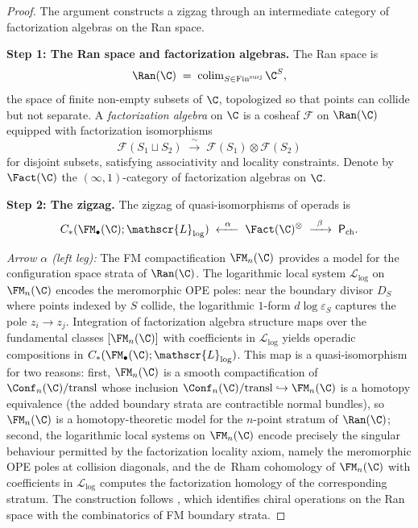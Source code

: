 \begin{proof}
The argument constructs a zigzag through an intermediate category of factorization algebras on the Ran space.

\medskip\noindent
\textbf{Step 1: The Ran space and factorization algebras.}
The Ran space is
\[
\Ran(\C) \;=\; \operatorname{colim}_{S \in \mathrm{Fin}^{\mathrm{surj}}} \C^S,
\]
the space of finite non-empty subsets of $\C$, topologized so that points can collide but not separate. A \emph{factorization algebra} on $\C$ is a cosheaf $\mathcal{F}$ on $\Ran(\C)$ equipped with factorization isomorphisms
\[
\mathcal{F}(S_1 \sqcup S_2) \;\xrightarrow{\;\sim\;}\; \mathcal{F}(S_1) \otimes \mathcal{F}(S_2)
\]
for disjoint subsets, satisfying associativity and locality constraints. Denote by $\Fact(\C)$ the $(\infty,1)$-category of factorization algebras on $\C$.

\medskip\noindent
\textbf{Step 2: The zigzag.}
The zigzag of quasi-isomorphisms of operads is
\[
C_\ast(\FM_\bullet(\C);\mathscr{L}_{\log}) \;\xleftarrow{\;\;\alpha\;\;}\; \Fact(\C)^{\otimes} \;\xrightarrow{\;\;\beta\;\;}\; \mathsf{P}_{\mathrm{ch}}.
\]

\emph{Arrow $\alpha$ (left leg):} The FM compactification $\FM_n(\C)$ provides a model for the configuration space strata of $\Ran(\C)$. The logarithmic local system $\mathscr{L}_{\log}$ on $\FM_n(\C)$ encodes the meromorphic OPE poles: near the boundary divisor $D_S$ where points indexed by $S$ collide, the logarithmic $1$-form $d\log\varepsilon_S$ captures the pole $z_i \to z_j$. Integration of factorization algebra structure maps over the fundamental classes $[\FM_n(\C)]$ with coefficients in $\mathscr{L}_{\log}$ yields operadic compositions in $C_\ast(\FM_\bullet(\C);\mathscr{L}_{\log})$. This map is a quasi-isomorphism for two reasons: first, $\FM_n(\C)$ is a smooth compactification of $\Conf_n(\C)/\mathrm{transl}$ whose inclusion $\Conf_n(\C)/\mathrm{transl} \hookrightarrow \FM_n(\C)$ is a homotopy equivalence (the added boundary strata are contractible normal bundles), so $\FM_n(\C)$ is a homotopy-theoretic model for the $n$-point stratum of $\Ran(\C)$; second, the logarithmic local systems on $\FM_n(\C)$ encode precisely the singular behaviour permitted by the factorization locality axiom, namely the meromorphic OPE poles at collision diagonals, and the de~Rham cohomology of $\FM_n(\C)$ with coefficients in $\mathscr{L}_{\log}$ computes the factorization homology of the corresponding stratum. The construction follows \cite[{\S}4.5.3]{BD04}, which identifies chiral operations on the Ran space with the combinatorics of FM boundary strata.


\end{proof}

